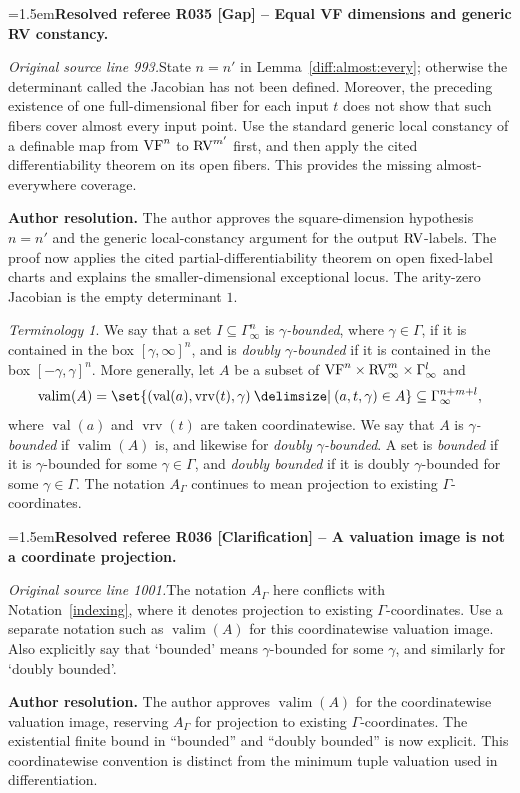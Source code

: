 \documentclass[12pt]{amsart}
\newcommand{\ResolvedRefereeRemark}[5]{%
  \par\medskip\begingroup\normalfont\small\color{gray}%
  \emergencystretch=1.5em\noindent\textbf{Resolved referee R#1 [#2] -- #3.}\par\nobreak\noindent #4\par
  \medskip\color{ResolutionGreen}\noindent\textbf{Author resolution.} #5\par
  \endgroup\medskip
}
\newcommand{\memph}[1]{{\color{magenta}\emph{#1}}}
\theoremstyle{plain}
\theoremstyle{definition}
\theoremstyle{remark}
\newtheorem{ter}[thm]{Terminology}
\numberwithin{equation}{section}
\theoremstyle{plain}
\newcommand{\VF}{\textup{VF}}
\newcommand{\RV}{\textup{RV}}
\newcommand{\0}{\emptyset}
\newcommand{\sub}{\subseteq}
\providecommand\given{}
\newcommand\SetSymbol[1][]{%
\nonscript \: #1 \vert
\allowbreak
\nonscript\:
\mathopen{}}
\renewcommand\given{\SetSymbol[\delimsize]}
\DeclareMathOperator{\vv}{val}
\DeclareMathOperator{\vrv}{vrv}
\begin{document}
\ResolvedRefereeRemark{035}{Gap}{Equal VF dimensions and generic RV constancy}{%
\textit{Original source line 993.}\quad State $n=n'$ in Lemma~\ref{diff:almost:every}; otherwise the determinant called the Jacobian has not been defined. Moreover, the preceding existence of one full-dimensional fiber for each input $t$ does not show that such fibers cover almost every input point. Use the standard generic local constancy of a definable map from $\VF^n$ to $\RV^{m'}$ first, and then apply the cited differentiability theorem on its open fibers. This provides the missing almost-everywhere coverage.
}{The author approves the square-dimension hypothesis $n=n'$ and the generic local-constancy argument for the output $\RV$-labels. The proof now applies the cited partial-differentiability theorem on open fixed-label charts and explains the smaller-dimensional exceptional locus. The arity-zero Jacobian is the empty determinant $1$.}

\begin{ter}\label{bounded}
We say that a set $I \sub \Gamma_{\infty}^n$ is \memph{$\gamma$-bounded}, where $\gamma \in \Gamma$, if it is contained in the box $[\gamma, \infty]^n$, and is \memph{doubly $\gamma$-bounded} if it is contained in the box $[-\gamma, \gamma]^n$. More generally, let $A$ be a subset of $\VF^n \times \RV_\infty^m \times \Gamma_\infty^l$ and
\[
\operatorname{valim}(A) = \set{(\vv(a), \vrv(t), \gamma) \given (a, t, \gamma) \in A} \sub \Gamma_{\infty}^{n+m+l},
\]
where $\vv(a)$ and $\vrv(t)$ are taken coordinatewise. We say that $A$ is \memph{$\gamma$-bounded} if $\operatorname{valim}(A)$ is, and likewise for \memph{doubly $\gamma$-bounded}. A set is \memph{bounded} if it is $\gamma$-bounded for some $\gamma\in\Gamma$, and \memph{doubly bounded} if it is doubly $\gamma$-bounded for some $\gamma\in\Gamma$. The notation $A_{\Gamma}$ continues to mean projection to existing $\Gamma$-coordinates.
\end{ter}

\ResolvedRefereeRemark{036}{Clarification}{A valuation image is not a coordinate projection}{%
\textit{Original source line 1001.}\quad The notation $A_\Gamma$ here conflicts with Notation~\ref{indexing}, where it denotes projection to existing $\Gamma$-coordinates. Use a separate notation such as $\operatorname{valim}(A)$ for this coordinatewise valuation image. Also explicitly say that `bounded' means $\gamma$-bounded for some $\gamma$, and similarly for `doubly bounded'.
}{The author approves $\operatorname{valim}(A)$ for the coordinatewise valuation image, reserving $A_{\Gamma}$ for projection to existing $\Gamma$-coordinates. The existential finite bound in ``bounded'' and ``doubly bounded'' is now explicit. This coordinatewise convention is distinct from the minimum tuple valuation used in differentiation.}
\end{document}
